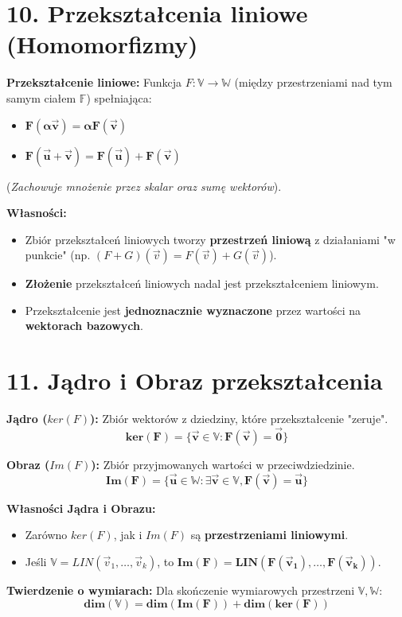 \documentclass[12pt,a4paper]{article}
\begin{document}
\section*{10. Przekształcenia liniowe (Homomorfizmy)}
\noindent\textbf{Przekształcenie liniowe:} Funkcja $F: \mathbb{V} \to \mathbb{W}$ (między przestrzeniami nad tym samym ciałem $\mathbb{F}$) spełniająca:
\begin{itemize}
    \item $\mathbf{F(\alpha\vec{v}) = \alpha F(\vec{v})}$
    \item $\mathbf{F(\vec{u} + \vec{v}) = F(\vec{u}) + F(\vec{v})}$
\end{itemize}
(\textit{Zachowuje mnożenie przez skalar oraz sumę wektorów}).

\noindent\textbf{Własności:}
\begin{itemize}
    \item Zbiór przekształceń liniowych tworzy \textbf{przestrzeń liniową} z działaniami "w punkcie" (np. $(F+G)(\vec{v}) = F(\vec{v}) + G(\vec{v})$).
    \item \textbf{Złożenie} przekształceń liniowych nadal jest przekształceniem liniowym.
    \item Przekształcenie jest \textbf{jednoznacznie wyznaczone} przez wartości na \textbf{wektorach bazowych}.
\end{itemize}

\section*{11. Jądro i Obraz przekształcenia}
\noindent\textbf{Jądro ($ker(F)$):} Zbiór wektorów z dziedziny, które przekształcenie "zeruje".
$$ \mathbf{ker(F) = \{\vec{v} \in \mathbb{V} : F(\vec{v}) = \vec{0}\}} $$

\noindent\textbf{Obraz ($Im(F)$):} Zbiór przyjmowanych wartości w przeciwdziedzinie.
$$ \mathbf{Im(F) = \{\vec{u} \in \mathbb{W} : \exists \vec{v} \in \mathbb{V}, F(\vec{v}) = \vec{u}\}} $$

\noindent\textbf{Własności Jądra i Obrazu:}
\begin{itemize}
    \item Zarówno $ker(F)$, jak i $Im(F)$ są \textbf{przestrzeniami liniowymi}.
    \item Jeśli $\mathbb{V} = LIN(\vec{v}_1, \dots, \vec{v}_k)$, to $\mathbf{Im(F) = LIN(F(\vec{v}_1), \dots, F(\vec{v}_k))}$.
\end{itemize}

\noindent\textbf{Twierdzenie o wymiarach:} Dla skończenie wymiarowych przestrzeni $\mathbb{V}, \mathbb{W}$:
$$ \mathbf{dim(\mathbb{V}) = dim(Im(F)) + dim(ker(F))} $$
\end{document}
